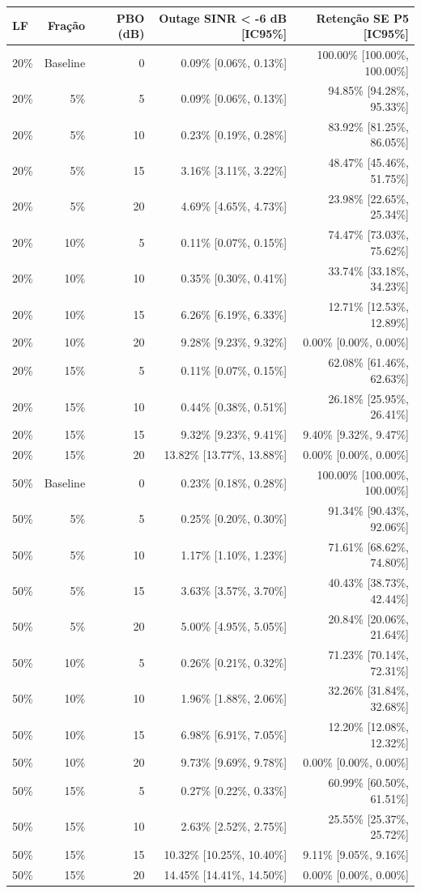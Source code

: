 \begin{tabular}{lrrrr}
\toprule
LF & Fração & PBO (dB) & Outage SINR < -6 dB [IC95\%] & Retenção SE P5 [IC95\%] \\
\midrule
20\% & Baseline & 0 & 0.09\% [0.06\%, 0.13\%] & 100.00\% [100.00\%, 100.00\%] \\
20\% & 5\% & 5 & 0.09\% [0.06\%, 0.13\%] & 94.85\% [94.28\%, 95.33\%] \\
20\% & 5\% & 10 & 0.23\% [0.19\%, 0.28\%] & 83.92\% [81.25\%, 86.05\%] \\
20\% & 5\% & 15 & 3.16\% [3.11\%, 3.22\%] & 48.47\% [45.46\%, 51.75\%] \\
20\% & 5\% & 20 & 4.69\% [4.65\%, 4.73\%] & 23.98\% [22.65\%, 25.34\%] \\
20\% & 10\% & 5 & 0.11\% [0.07\%, 0.15\%] & 74.47\% [73.03\%, 75.62\%] \\
20\% & 10\% & 10 & 0.35\% [0.30\%, 0.41\%] & 33.74\% [33.18\%, 34.23\%] \\
20\% & 10\% & 15 & 6.26\% [6.19\%, 6.33\%] & 12.71\% [12.53\%, 12.89\%] \\
20\% & 10\% & 20 & 9.28\% [9.23\%, 9.32\%] & 0.00\% [0.00\%, 0.00\%] \\
20\% & 15\% & 5 & 0.11\% [0.07\%, 0.15\%] & 62.08\% [61.46\%, 62.63\%] \\
20\% & 15\% & 10 & 0.44\% [0.38\%, 0.51\%] & 26.18\% [25.95\%, 26.41\%] \\
20\% & 15\% & 15 & 9.32\% [9.23\%, 9.41\%] & 9.40\% [9.32\%, 9.47\%] \\
20\% & 15\% & 20 & 13.82\% [13.77\%, 13.88\%] & 0.00\% [0.00\%, 0.00\%] \\
50\% & Baseline & 0 & 0.23\% [0.18\%, 0.28\%] & 100.00\% [100.00\%, 100.00\%] \\
50\% & 5\% & 5 & 0.25\% [0.20\%, 0.30\%] & 91.34\% [90.43\%, 92.06\%] \\
50\% & 5\% & 10 & 1.17\% [1.10\%, 1.23\%] & 71.61\% [68.62\%, 74.80\%] \\
50\% & 5\% & 15 & 3.63\% [3.57\%, 3.70\%] & 40.43\% [38.73\%, 42.44\%] \\
50\% & 5\% & 20 & 5.00\% [4.95\%, 5.05\%] & 20.84\% [20.06\%, 21.64\%] \\
50\% & 10\% & 5 & 0.26\% [0.21\%, 0.32\%] & 71.23\% [70.14\%, 72.31\%] \\
50\% & 10\% & 10 & 1.96\% [1.88\%, 2.06\%] & 32.26\% [31.84\%, 32.68\%] \\
50\% & 10\% & 15 & 6.98\% [6.91\%, 7.05\%] & 12.20\% [12.08\%, 12.32\%] \\
50\% & 10\% & 20 & 9.73\% [9.69\%, 9.78\%] & 0.00\% [0.00\%, 0.00\%] \\
50\% & 15\% & 5 & 0.27\% [0.22\%, 0.33\%] & 60.99\% [60.50\%, 61.51\%] \\
50\% & 15\% & 10 & 2.63\% [2.52\%, 2.75\%] & 25.55\% [25.37\%, 25.72\%] \\
50\% & 15\% & 15 & 10.32\% [10.25\%, 10.40\%] & 9.11\% [9.05\%, 9.16\%] \\
50\% & 15\% & 20 & 14.45\% [14.41\%, 14.50\%] & 0.00\% [0.00\%, 0.00\%] \\
\bottomrule
\end{tabular}
